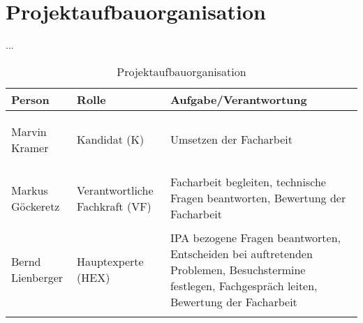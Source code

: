 \chapter{Projektaufbauorganisation}\label{ch:projektaufbauorganisation}
...

\renewcommand{\arraystretch}{1.5}
\begin{longtable}{|p{}|p{}|p{}|}
    \hline
    \textbf{Person} & \textbf{Rolle} & \textbf{Aufgabe/Verantwortung} \\
    \hline
    \hypertarget{k}{Marvin Kramer} & Kandidat (K) & Umsetzen der Facharbeit \\
    \hline
    \hypertarget{vf}{Markus Göckeretz} & Verantwortliche Fachkraft (VF) & Facharbeit begleiten, technische Fragen beantworten, Bewertung der Facharbeit \\
    \hline
    \hypertarget{hex}{Bernd Lienberger} & Hauptexperte (HEX) & IPA bezogene Fragen beantworten, Entscheiden bei auftretenden Problemen, Besuchstermine festlegen, Fachgespräch leiten, Bewertung der Facharbeit \\
    \hline
    \caption{Projektaufbauorganisation}\label{tab:projektaufbauorganisation}
\end{longtable}
\renewcommand{\arraystretch}{1}
